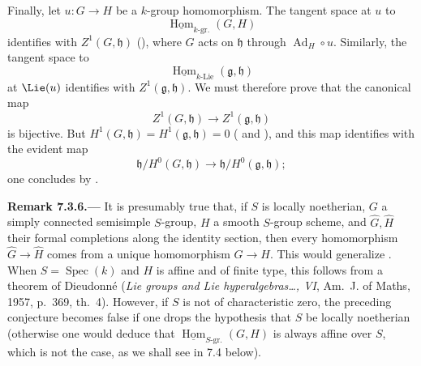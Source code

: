 Finally, let \(u:G\to H\) be a \(k\)-group homomorphism. The tangent
space at \(u\) to
\[
  \underline{\operatorname{Hom}}_{k\text{-}\mathrm{gr.}}(G,H)
\]
identifies with \(Z^1(G,\mathfrak h)\) (), where
\(G\) acts on \(\mathfrak h\) through
\(\operatorname{Ad}_H\circ u\). Similarly, the tangent space to
\[
  \underline{\operatorname{Hom}}_{k\text{-}\mathrm{Lie}}
    (\mathfrak g,\mathfrak h)
\]
at \(\Lie(u)\) identifies with \(Z^1(\mathfrak g,\mathfrak h)\). We
must therefore prove that the canonical map
\[
  Z^1(G,\mathfrak h)\longrightarrow
  Z^1(\mathfrak g,\mathfrak h)
\]
is bijective. But \(H^1(G,\mathfrak h)=H^1(\mathfrak g,\mathfrak h)=0\)
\textup{( and )}, and this map identifies
with the evident map
\[
  \mathfrak h/H^0(G,\mathfrak h)\longrightarrow\mathfrak h/H^0(\mathfrak g,\mathfrak h);
\]
one concludes by .

\par\medskip\noindent{}\textbf{Remark 7.3.6.---}\enspace
It is presumably true that, if \(S\) is locally noetherian, \(G\) a
simply connected semisimple \(S\)-group, \(H\) a smooth \(S\)-group
scheme, and \(\widehat G,\widehat H\) their formal completions along
the identity section, then every homomorphism
\(\widehat G\to\widehat H\) comes from a unique homomorphism \(G\to H\).
This would generalize . When \(S=\operatorname{Spec}(k)\)
and \(H\) is affine and of finite type, this follows from a theorem of
Dieudonné (\emph{Lie groups and Lie hyperalgebras\ldots, VI}, Am.\ J. of Maths, 1957, p.~369,
th.~4). However, if \(S\) is not of characteristic zero, the preceding conjecture becomes false if
one drops the hypothesis that \(S\) be locally noetherian (otherwise one would deduce that
\(\underline{\operatorname{Hom}}_{S\text{-}\mathrm{gr.}}(G,H)\) is always affine over \(S\), which
is not the case, as we shall see in 7.4 below).

